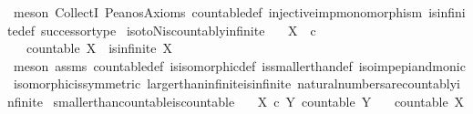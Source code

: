 \begin{isabellebody}
\isamarkupfalse%
\ {\isacharparenleft}{\kern0pt}meson\ CollectI\ Peano{\isacharprime}{\kern0pt}s{\isacharunderscore}{\kern0pt}Axioms\ countable{\isacharunderscore}{\kern0pt}def\ injective{\isacharunderscore}{\kern0pt}imp{\isacharunderscore}{\kern0pt}monomorphism\ is{\isacharunderscore}{\kern0pt}infinite{\isacharunderscore}{\kern0pt}def\ successor{\isacharunderscore}{\kern0pt}type{\isacharparenright}{\kern0pt}%
\endisatagproof
{\isafoldproof}%
%
\isadelimproof
\isanewline
%
\endisadelimproof
\isanewline
{}\isamarkupfalse%
\ iso{\isacharunderscore}{\kern0pt}to{\isacharunderscore}{\kern0pt}N{\isacharunderscore}{\kern0pt}is{\isacharunderscore}{\kern0pt}countably{\isacharunderscore}{\kern0pt}infinite{\isacharcolon}{\kern0pt}\isanewline
\ \ \ {\isachardoublequoteopen}X\ {\isasymcong}\ {\isasymnat}\isactrlsub c{\isachardoublequoteclose}\isanewline
\ \ \ {\isachardoublequoteopen}countable\ X\ {\isasymand}\ is{\isacharunderscore}{\kern0pt}infinite\ X{\isachardoublequoteclose}\isanewline
%
\isadelimproof
\ \ %
\endisadelimproof
%
\isatagproof
{}\isamarkupfalse%
\ {\isacharparenleft}{\kern0pt}meson\ assms\ countable{\isacharunderscore}{\kern0pt}def\ is{\isacharunderscore}{\kern0pt}isomorphic{\isacharunderscore}{\kern0pt}def\ is{\isacharunderscore}{\kern0pt}smaller{\isacharunderscore}{\kern0pt}than{\isacharunderscore}{\kern0pt}def\ iso{\isacharunderscore}{\kern0pt}imp{\isacharunderscore}{\kern0pt}epi{\isacharunderscore}{\kern0pt}and{\isacharunderscore}{\kern0pt}monic\ isomorphic{\isacharunderscore}{\kern0pt}is{\isacharunderscore}{\kern0pt}symmetric\ larger{\isacharunderscore}{\kern0pt}than{\isacharunderscore}{\kern0pt}infinite{\isacharunderscore}{\kern0pt}is{\isacharunderscore}{\kern0pt}infinite\ natural{\isacharunderscore}{\kern0pt}numbers{\isacharunderscore}{\kern0pt}are{\isacharunderscore}{\kern0pt}countably{\isacharunderscore}{\kern0pt}infinite{\isacharparenright}{\kern0pt}%
\endisatagproof
{\isafoldproof}%
%
\isadelimproof
\isanewline
%
\endisadelimproof
\isanewline
{}\isamarkupfalse%
\ smaller{\isacharunderscore}{\kern0pt}than{\isacharunderscore}{\kern0pt}countable{\isacharunderscore}{\kern0pt}is{\isacharunderscore}{\kern0pt}countable{\isacharcolon}{\kern0pt}\isanewline
\ \ \ {\isachardoublequoteopen}X\ {\isasymle}\isactrlsub c\ Y{\isachardoublequoteclose}\ {\isachardoublequoteopen}countable\ Y{\isachardoublequoteclose}\isanewline
\ \ \ {\isachardoublequoteopen}countable\ X{\isachardoublequoteclose}\isanewline
%
\isadelimproof

\end{isabellebody}
